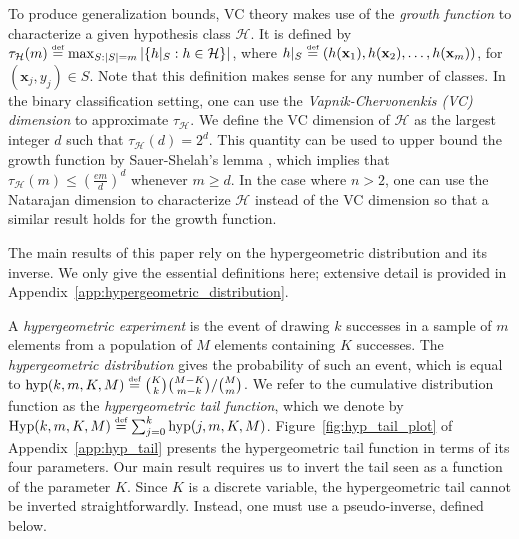 \documentclass[twoside,11pt]{article}
\renewcommand{\H}{{\mathcal{H}}}
\newcommand{\x}{\mathbf{x}}
\newcommand{\eqdef}{\overset{\smash{\mbox{\tiny \rm def}}}{=}}
\newcommand{\hyp}{\textnormal{hyp}}
\newcommand{\Hyp}{\textnormal{Hyp}}
\begin{document}
To produce generalization bounds, VC theory makes use of the \emph{growth function} to characterize a given hypothesis class $\H$.
It is defined by $\tau_\H(m) \eqdef \max_{S:\left|S\right|=m} \left| \left\{ h|_S : h \in \H\right\} \right|$, where $h|_S \eqdef (h(\x_1), h(\x_2), \dots, h(\x_m))$, for $(\x_j,y_j) \in S$.
Note that this definition makes sense for any number of classes.
In the binary classification setting, one can use the \emph{Vapnik-Chervonenkis (VC) dimension} to approximate $\tau_\H$.
We define the VC dimension of $\H$ as the largest integer $d$ such that $\tau_\H(d) = 2^d$.
This quantity can be used to upper bound the growth function by Sauer-Shelah's lemma \citep{vapnik71}, which implies that $\tau_\H(m) \le \left( \frac{em}{d} \right)^d$ whenever $m \ge d$.
In the case where $n > 2$, one can use the Natarajan dimension \citep{bendavid95characterizations} to characterize $\H$ instead of the VC dimension so that a similar result holds for the growth function.

The main results of this paper rely on the hypergeometric distribution and its inverse.
We only give the essential definitions here; extensive detail is provided in Appendix~\ref{app:hypergeometric_distribution}.

A \emph{hypergeometric experiment} is the event of drawing $k$ successes in a sample of $m$ elements from a population of $M$ elements containing $K$ successes.
The \emph{hypergeometric distribution} gives the probability of such an event, which is equal to $\hyp(k,m,K,M) \eqdef \binom{K}{k}\binom{M-K}{m-k} / \binom{M}{m}$.
We refer to the cumulative distribution function as the \emph{hypergeometric tail function}, which we denote by $\Hyp(k,m,K,M) \eqdef \sum_{j=0}^k \hyp(j,m,K,M)$.
Figure~\ref{fig:hyp_tail_plot} of Appendix~\ref{app:hyp_tail} presents the hypergeometric tail function in terms of its four parameters.
Our main result requires us to invert the tail seen as a function of the parameter $K$.
Since $K$ is a discrete variable, the hypergeometric tail cannot be inverted straightforwardly.
Instead, one must use a pseudo-inverse, defined below.
\end{document}
